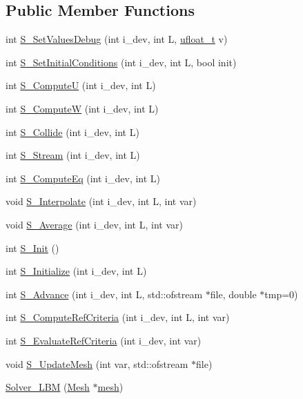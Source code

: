 \subsection*{Public Member Functions}
\begin{DoxyCompactItemize}
\item 
int \hyperlink{classSolver__LBM_abf91dd13737bd2232d191e21c20cbc33}{S\+\_\+\+Set\+Values\+Debug} (int i\+\_\+dev, int L, \hyperlink{cppspec_8h_af529d360dfac9b9578aa719418a53a21}{ufloat\+\_\+t} v)
\item 
int \hyperlink{classSolver__LBM_a05326a4c80d68bd0f7e70186fb8c4c38}{S\+\_\+\+Set\+Initial\+Conditions} (int i\+\_\+dev, int L, bool init)
\item 
int \hyperlink{classSolver__LBM_ac172ea0929788514a72ee6b42befe84c}{S\+\_\+\+ComputeU} (int i\+\_\+dev, int L)
\item 
int \hyperlink{classSolver__LBM_a9d31d1d8602462a3134a320c9e3d7c2c}{S\+\_\+\+ComputeW} (int i\+\_\+dev, int L)
\item 
int \hyperlink{classSolver__LBM_ab8c4daacb227f1ac1bf6a54097d65bd3}{S\+\_\+\+Collide} (int i\+\_\+dev, int L)
\item 
int \hyperlink{classSolver__LBM_ad301e7ccad5f700a94a12762f92939db}{S\+\_\+\+Stream} (int i\+\_\+dev, int L)
\item 
int \hyperlink{classSolver__LBM_acacdadaa96b72ca8a7f13a657a25c6f1}{S\+\_\+\+Compute\+Eq} (int i\+\_\+dev, int L)
\item 
void \hyperlink{classSolver__LBM_a1ae0246ed9aa764eafce29a5f7ef7d42}{S\+\_\+\+Interpolate} (int i\+\_\+dev, int L, int var)
\item 
void \hyperlink{classSolver__LBM_ae4487d21dd9b3f94a4e6e367b37698fa}{S\+\_\+\+Average} (int i\+\_\+dev, int L, int var)
\item 
int \hyperlink{classSolver__LBM_ac8195f75a91e0c41f3b7908cebc5c8d6}{S\+\_\+\+Init} ()
\item 
int \hyperlink{classSolver__LBM_a215918c1e81dc85315651948bbc86173}{S\+\_\+\+Initialize} (int i\+\_\+dev, int L)
\item 
int \hyperlink{classSolver__LBM_a9f5927018c5068edc1f31ead745a6e05}{S\+\_\+\+Advance} (int i\+\_\+dev, int L, std\+::ofstream $\ast$file, double $\ast$tmp=0)
\item 
int \hyperlink{classSolver__LBM_a9c7637ab5e8dde0e9c957661758a738e}{S\+\_\+\+Compute\+Ref\+Criteria} (int i\+\_\+dev, int L, int var)
\item 
int \hyperlink{classSolver__LBM_a8809dbbf5653c40202da0611afb6dcaa}{S\+\_\+\+Evaluate\+Ref\+Criteria} (int i\+\_\+dev, int var)
\item 
void \hyperlink{classSolver__LBM_a59e8d7c94e3895a3586972bdbf0ebb77}{S\+\_\+\+Update\+Mesh} (int var, std\+::ofstream $\ast$file)
\item 
\hyperlink{classSolver__LBM_a8fed041efa5cee6ff2eaba9c23406074}{Solver\+\_\+\+L\+BM} (\hyperlink{classMesh}{Mesh} $\ast$\hyperlink{classSolver_a9b516765134fb4193329639761924cf7}{mesh})
\end{DoxyCompactItemize}
